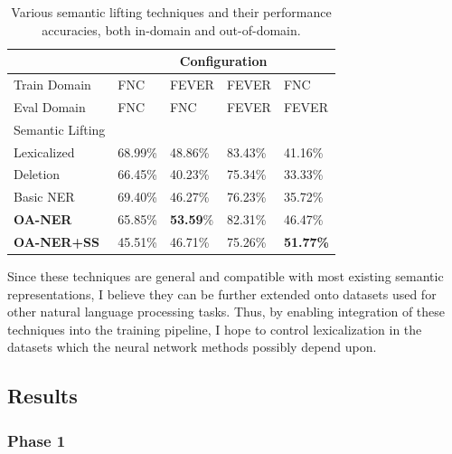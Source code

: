 \documentclass{article}
\begin{document}
\begin{table}[t]
\begin{center}
\begin{tabular}{p{22mm}|p{9mm}p{9mm}p{9mm}p{9mm}}
 & \multicolumn{4}{c}{Configuration} \\
 \hline
Train Domain & {FNC}& {FEVER}  & {FEVER} & {{FNC}} \\ 
Eval Domain & {FNC}& {{FNC}}  & {FEVER} & {{FEVER}} \\ \hline
Semantic Lifting & & & & \\
\hline
Lexicalized &68.99\%& {48.86\%} &83.43\%& {41.16\%} \\
Deletion  &66.45\%& 40.23\% &75.34\%& 33.33\% \\
Basic NER &69.40\%& 46.27\% &76.23\%& 35.72\%\\
\textbf{OA-NER} &65.85\%& \textbf{53.59}\% &{82.31\%}& {46.47\%}\\
\textbf{OA-NER+SS} & 45.51\%& 46.71\% &75.26\%& {\bf 51.77\%}\\
\end{tabular}
\end{center}
    \caption{\label{crossdomain} Various semantic lifting techniques and their performance accuracies, both in-domain and out-of-domain.} \label{tab:results}

\end{table}
Since these techniques are general and compatible with most existing semantic representations, I believe they can be further extended onto datasets used for other natural language processing tasks. Thus, by enabling integration of these techniques into the training pipeline, I hope to control lexicalization in the datasets which the neural network methods possibly depend upon. 




\subsection{Results} 
\label{sec:results}


\subsubsection{Phase 1}
\end{document}
